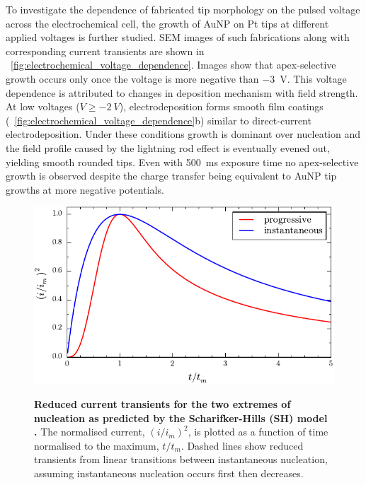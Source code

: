 \documentclass{article}
\begin{document}
To investigate the dependence of fabricated tip morphology on the pulsed voltage across the electrochemical cell, the growth of AuNP on Pt tips at different applied voltages is further studied. SEM images of such fabrications along with corresponding current transients are shown in \figurename~\ref{fig:electrochemical_voltage_dependence}. Images show that apex-selective growth occurs only once the voltage is more negative than \SI{-3}{V}. This voltage dependence is attributed to changes in deposition mechanism with field strength.
At low voltages ($V \geq \SI{-2}{V}$), electrodeposition forms smooth film coatings (\figurename~\ref{fig:electrochemical_voltage_dependence}b) similar to direct-current electrodeposition. Under these conditions growth is dominant over nucleation and the field profile caused by the lightning rod effect is eventually evened out, yielding smooth rounded tips. Even with \SI{500}{ms} exposure time no apex-selective growth is observed despite the charge transfer being equivalent to AuNP tip growths at more negative potentials.

\begin{figure}[bt]
\centering
{\includegraphics{figures/nucleation_theory}}
{\caption[Reduced current transients for the two extremes of nucleation as predicted by the Scharifker-Hills (SH) model \cite{scharifker1983}.]{\textbf{Reduced current transients for the two extremes of nucleation as predicted by the Scharifker-Hills (SH) model \cite{scharifker1983}.} The normalised current, $(i/i_m)^2$, is plotted as a function of time normalised to the maximum, $t/t_m$. Dashed lines show reduced transients from linear transitions between instantaneous nucleation, assuming instantaneous nucleation occurs first then decreases.}
\label{fig:nucleation_theory}}
\vspace{-5pt}
\end{figure}
\end{document}
